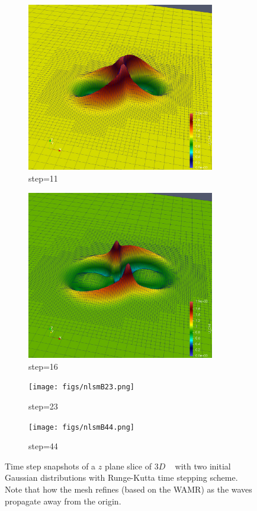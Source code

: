 \documentclass[landscape]{a0poster}
\begin{document}
\begin{textblock}{32}
\begin{textblock}{14}
\begin{figure}
\begin{subfigure}{0.33\textwidth}
			\includegraphics[width=0.9\textwidth]{figs/nlsmB11.png}
			\caption{step=11}
		\end{subfigure}\hfil
		\begin{subfigure}{0.33\textwidth}
			\includegraphics[width=0.9\textwidth]{figs/nlsmB16.png}
			\caption{step=16}			
		\end{subfigure}
		\begin{subfigure}{0.33\textwidth}
			\texttt{[image: figs/nlsmB23.png]}
			\caption{step=23}
		\end{subfigure}
		\begin{subfigure}{0.33\textwidth}
			\texttt{[image: figs/nlsmB44.png]}
			\caption{step=44}
		\end{subfigure}
		\caption{Time step snapshots of a $z$ plane slice of $3D$ \NLSM~ with two initial Gaussian distributions with Runge-Kutta time stepping scheme. Note that how the mesh refines (based on the WAMR) as the waves 
			propagate away from the origin.   \label{fig:nlsmB}}
		\vspace{-0.2in}
	\end{figure}
	

\end{textblock}
\end{textblock}
\end{document}
